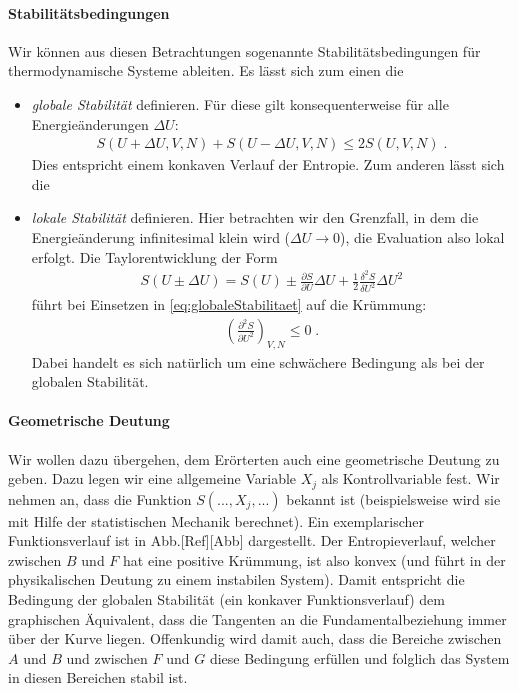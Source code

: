 \paragraph*{Stabilitätsbedingungen} Wir können aus diesen Betrachtungen sogenannte Stabilitätsbedingungen für thermodynamische Systeme ableiten.
Es lässt sich zum einen die 
\begin{itemize}
    \item \emph{globale Stabilität} definieren. Für diese gilt konsequenterweise für alle Energieänderungen $\Delta U$:
    \begin{align}
        \label{eq:globaleStabilitaet}
        \boxed{S(U+\Delta U,V,N)+S(U-\Delta U,V,N)\leq 2S(U,V,N)}\;.
    \end{align}
    Dies entspricht einem konkaven Verlauf der Entropie. Zum anderen lässt sich die 
    \item \emph{lokale Stabilität} definieren. Hier betrachten wir den Grenzfall, in dem die Energieänderung infinitesimal klein wird ($\Delta U\rightarrow 0$), die Evaluation also lokal erfolgt.   
    Die Taylorentwicklung der Form
    \begin{align*}
        S(U\pm\Delta U)=S(U)\pm \frac{\partial S}{\partial U}\Delta U+\frac{1}{2}\frac{\delta^2S}{\delta U^2}\Delta U^2
    \end{align*}
    führt bei Einsetzen in \ref{eq:globaleStabilitaet} auf die Krümmung:
    \begin{align}
		\label{eq:lokaleStabilitaet}
        \boxed{\left(\frac{\partial^2S}{\partial U^2}\right)_{V,N}\leq 0}\;.
    \end{align}
    Dabei handelt es sich natürlich um eine schwächere Bedingung als bei der globalen Stabilität.
\end{itemize}
\paragraph*{Geometrische Deutung}
Wir wollen dazu übergehen, dem Erörterten auch eine geometrische Deutung zu geben. Dazu legen wir eine allgemeine Variable $X_j$ als Kontrollvariable fest.
Wir nehmen an, dass die Funktion $S(...,X_j,...)$ bekannt ist (beispielsweise wird sie mit Hilfe der statistischen Mechanik berechnet). Ein exemplarischer Funktionsverlauf ist in Abb.[Ref][Abb] dargestellt. Der Entropieverlauf, welcher zwischen $B$ und $F$ hat eine positive Krümmung, ist also konvex (und führt in der physikalischen Deutung zu einem instabilen System). Damit entspricht die Bedingung der globalen Stabilität (ein konkaver Funktionsverlauf) dem graphischen Äquivalent, dass die Tangenten an die Fundamentalbeziehung immer über der Kurve liegen. Offenkundig wird damit auch, dass die Bereiche zwischen $A$ und $B$ und zwischen $F$ und $G$ diese Bedingung erfüllen und folglich das System in diesen Bereichen stabil ist.

